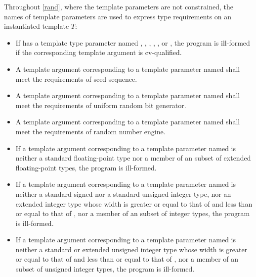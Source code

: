 \pnum
Throughout \ref{rand},
where the template parameters are not constrained,
the names of template parameters are used to express type requirements
on an instantiated template $T$:
\begin{itemize}
  \item
    If  has a template type parameter named
    , , ,
    , , or ,
    the program is ill-formed if the corresponding template argument is cv-qualified.
  \item
    A template argument corresponding to a template parameter
    named 
    shall meet the requirements
    of seed sequence.
  \item
    A template argument corresponding to a template parameter
    named 
    shall meet the requirements
    of uniform random bit generator.
  \item
    A template argument corresponding to a template parameter
    named 
    shall meet the requirements
    of random number engine.
  \item
    If a template argument corresponding to a template parameter
    named 
    is neither
    a standard floating-point type nor
    a member of an
     subset of extended floating-point types,
    the program is ill-formed.
  \item
    If a template argument corresponding to a template parameter
    named 
    is neither
    a standard signed nor a standard unsigned integer type, nor
    an extended integer type whose width is
    greater or equal to that of  and
    less than or equal to that of , nor
    a member of an
    subset of integer types, the program is ill-formed.
  \item
    If a template argument corresponding to a template parameter
    named 
    is neither
    a standard or extended unsigned integer type whose width is
    greater or equal to that of  and
    less than or equal to that of , nor
    a member of an
    subset of unsigned integer types, the program is ill-formed.
\end{itemize}

